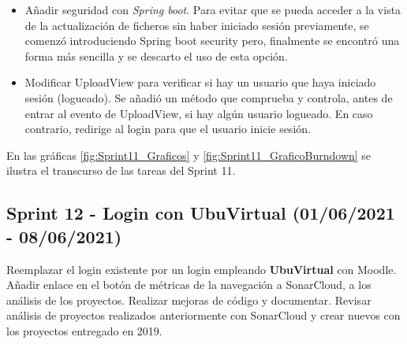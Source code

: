 \begin{itemize}
	\item Añadir seguridad con \emph{Spring boot}.
		Para evitar que se pueda acceder a la vista de la actualización de ficheros sin haber iniciado sesión previamente, se comenzó introduciendo Spring boot security pero, finalmente se encontró una forma más sencilla y se descarto el uso de esta opción.
	\item Modificar UploadView para verificar si hay un usuario que haya iniciado sesión (logueado).
		Se añadió un método que comprueba y controla, antes de entrar al evento de UploadView, si hay algún usuario logueado. En caso contrario, redirige al login para que el usuario inicie sesión. 
	
\end{itemize}

En las gráficas \ref{fig:Sprint11_Graficos} y \ref{fig:Sprint11_GraficoBurndown} se ilustra el transcurso de las tareas del Sprint 11.


\subsection{Sprint 12 - Login con UbuVirtual (01/06/2021 - 08/06/2021)}
Reemplazar el login existente por un login empleando \textbf{UbuVirtual} con Moodle. Añadir enlace en el botón de métricas de la navegación a SonarCloud, a los análisis de los proyectos. Realizar mejoras de código y documentar. Revisar análisis de proyectos realizados anteriormente con SonarCloud y crear nuevos con los proyectos entregado en 2019.

